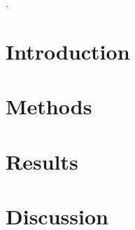\documentclass[12pt, fleqn]{article}
\begin{document}
\tableofcontents

\setlength{\headheight}{15pt}
\addtolength{\topmargin}{-2.5pt}.

\section{Introduction}
\label{sec:intro}
\cite{lin2020ensemble}


\section{Methods}%
\label{sec:methods}

\section{Results}%
\label{sec:results}

\section{Discussion}%
\label{sec:discussion}


\renewcommand*{\bibfont}{\normalfont\footnotesize}
\printbibliography[heading=bibintoc]

\appendix
{}
\end{document}
